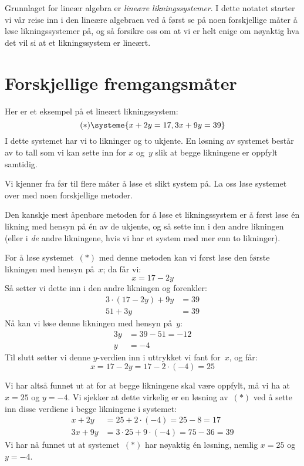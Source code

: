 




\noindent%
Grunnlaget for lineær algebra er \emph{lineære liknings\-systemer}.  I
dette notatet starter vi vår reise inn i den lineære algebraen ved å
først se på noen forskjellige måter å løse likningssystemer på, og så
forsikre oss om at vi er helt enige om nøyaktig hva det vil si at et
likningssystem er lineært.

\section*{Forskjellige fremgangsmåter}

Her er et eksempel på et lineært likningssystem:
\[
(\ast)
\systeme{
 x + 2y = 17,
3x + 9y = 39
}
\]
I dette systemet har vi to likninger og to ukjente.
En løsning av systemet består av to tall som vi kan sette inn
for $x$ og~$y$ slik at begge likningene er oppfylt samtidig.

Vi kjenner fra før til flere måter å løse et slikt system på.  La oss
løse systemet over med noen forskjellige metoder.

\begin{ex}
Den kanskje mest åpenbare metoden for å løse et likningssystem er å
først løse én likning med hensyn på én av de ukjente, og så sette inn
i den andre likningen (eller i \emph{de} andre likningene, hvis vi har
et system med mer enn to likninger).

For å løse systemet~$(\ast)$ med denne metoden kan vi først løse den
første likningen med hensyn på~$x$; da får vi:
\[
x = 17 - 2y
\]
Så setter vi dette inn i den andre likningen og forenkler:
\begin{align*}
3 \cdot (17 - 2y) + 9y &= 39 \\
51 + 3y &= 39
\end{align*}
Nå kan vi løse denne likningen med hensyn på~$y$:
\begin{align*}
3y &= 39 - 51 = -12 \\
y &= -4
\end{align*}
Til slutt setter vi denne $y$-verdien inn i uttrykket vi fant for~$x$,
og får:
\[
x = 17 - 2y = 17 - 2 \cdot (-4) = 25
\]

Vi har altså funnet ut at for at begge likningene skal være oppfylt,
må vi ha at $x = 25$ og $y = -4$.  Vi sjekker at dette virkelig er en
løsning av~$(\ast)$ ved å sette inn disse verdiene i begge likningene
i systemet:
\begin{align*}
x + 2y &= 25 + 2 \cdot (-4) = 25 - 8 = 17 \\
3x + 9y &= 3 \cdot 25 + 9 \cdot (-4) = 75 - 36 = 39
\end{align*}
Vi har nå funnet ut at systemet~$(\ast)$ har nøyaktig én løsning,
nemlig $x = 25$ og $y = -4$.
\end{ex}


